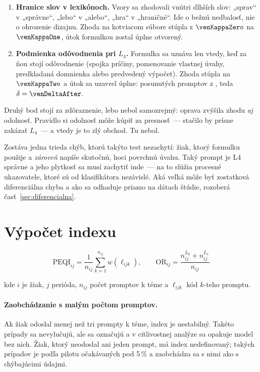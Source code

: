 \begin{enumerate}[nosep]
    \item \textbf{Hranice slov v lexikónoch.} Vzory sa zhodovali vnútri dlhších slov: „sprav“ v „správne“, „lebo“ v „alebo“, „hra“ v „hraničné“. Ide o bežnú nedbalosť, nie o ohrozenie dizajnu. Zhoda na kotviacom súbore stúpla z $\venKappaZero$ na $\venKappaOne$, útok formulkou zostal úplne otvorený.
    \item \textbf{Podmienka odôvodnenia pri $L_4$.} Formulka sa uznáva len vtedy, keď za ňou stojí odôvodnenie (spojka príčiny, pomenovanie vlastnej úvahy, predkladaná domnienka alebo predvedený výpočet). Zhoda stúpla na $\venKappaTwo$ a útok sa uzavrel úplne: \venShiftedAfter{} posunutých promptov z \venN{}, teda $\delta = \venDeltaAfter$.
\end{enumerate}

Druhý bod stojí za zdôraznenie, lebo nebol samozrejmý: oprava zvýšila zhodu \emph{aj} odolnosť. Pravidlo si odolnosť môže kúpiť za presnosť~--- stačilo by prísne zakázať $L_4$~--- a vtedy je to zlý obchod. Tu nebol.

Zostáva jedna trieda chýb, ktorú takýto test nezachytí: žiak, ktorý formulku použije a \emph{zároveň} napíše skutočnú, hoci povrchnú úvahu. Taký prompt je L4 správne a jeho plytkosť sa musí zachytiť inde~--- na to slúžia procesné ukazovatele, ktoré sú od klasifikátora nezávislé. Aká veľká môže byť zostatková diferenciálna chyba a ako sa odhaduje priamo na dátach štúdie, rozoberá časť~\ref{sec:diferencialna}.

\section{Výpočet indexu}

\begin{equation*}
    \mathrm{PEQI}_{ij} = \frac{1}{n_{ij}}\sum_{k=1}^{n_{ij}} w(\ell_{ijk}),
    \qquad
    \mathrm{OR}_{ij} = \frac{n^{L_0}_{ij}+n^{L_1}_{ij}}{n_{ij}}
\end{equation*}

kde $i$ je žiak, $j$ perióda, $n_{ij}$ počet promptov k téme a $\ell_{ijk}$ kód $k$-teho promptu.

\paragraph{Zaobchádzanie s malým počtom promptov.} Ak žiak odoslal menej než tri prompty k téme, index je nestabilný. Takéto prípady sa nevylučujú, ale sa označujú a v citlivostnej analýze sa opakuje model bez nich. Žiak, ktorý neodoslal ani jeden prompt, má index nedefinovaný; takých prípadov je podľa pilotu očakávaných pod 5\,\% a zaobchádza sa s nimi ako s chýbajúcimi údajmi.

